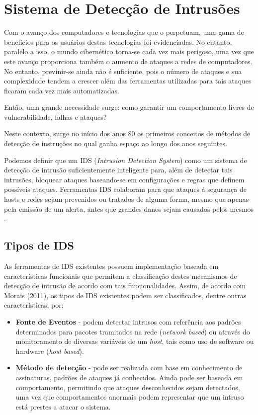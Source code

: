 \chapter{Sistema de Detecção de Intrusões}
\label{chap:IDS}

	Com o avanço dos computadores e tecnologias que o perpetuam, uma gama de benefícios para os usuários destas tecnologias foi evidenciadas. No entanto, paralelo a isso, o mundo cibernético torna-se cada vez mais perigoso, uma vez que este avanço proporciona também o aumento de ataques a redes de computadores. No entanto, previnir-se ainda não é suficiente, pois o número de ataques e sua complexidade tendem a crescer além das ferramentas utilizadas para tais ataques ficaram cada vez mais automatizadas.

	Então, uma grande necessidade surge: como garantir um comportamento livres de vulnerabilidade, falhas e ataques?

	Neste contexto, surge no início dos anos 80 os primeiros conceitos de métodos de detecção de instruções no qual ganha espaço ao longo dos anos seguintes.

	Podemos definir que um IDS (\textit{Intrusion Detection System}) como um sistema de detecção de intrusão suficientemente inteligente para, além de detectar tais intrusões, bloquear ataques baseando-se em configurações e regras que definem possíveis ataques. Ferramentas IDS colaboram para que ataques à segurança de hosts e redes sejam prevenidos ou tratados de alguma forma, mesmo que apenas pela emissão de um alerta, antes que grandes danos sejam causados pelos mesmos \cite{Comunidade_Snort_Brasil}.

	\section{Tipos de IDS}
	\label{sec:IDS_Tipos}

	As ferramentas de IDS existentes possuem implementação baseada em características funcionais que permitem a classificação destes mecanismos de detecção de intrusão de acordo com tais funcionalidades. Assim, de acordo com Morais (2011), os tipos de IDS existentes podem ser classificados, dentre outras características, por:
		\begin{itemize}
			\item \textbf{Fonte de Eventos} - podem detectar intrusos com referência aos padrões determinados para pacotes tramitados na rede (\textit{network based}) ou através do monitoramento de diversas variáveis de um \textit{host}, tais como uso de software ou hardware (\textit{host based}).
	
			\item \textbf{Método de detecção} - pode ser realizada com base em conhecimento de assinaturas, padrões de ataques já conhecidos. Ainda pode ser baseada em comportamento, permitindo que ataques desconhecidos sejam detectados, uma vez que comportamentos anormais podem representar que um intruso está prestes a atacar o sistema.	
		\end{itemize}

